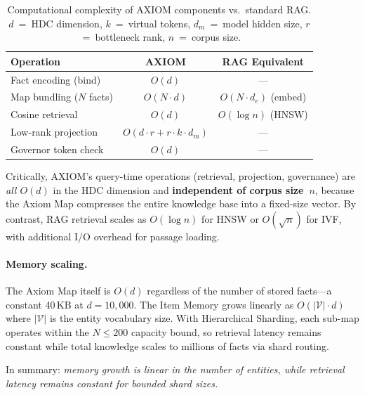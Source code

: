 \documentclass[11pt,a4paper]{article}
\begin{document}
\begin{table}[t]
    \centering
    \caption{Computational complexity of AXIOM components vs.\
    standard RAG.  $d$~=~HDC dimension, $k$~=~virtual tokens,
    $d_m$~=~model hidden size, $r$~=~bottleneck rank, $n$~=~corpus size.}
    \label{tab:complexity}
    \begin{tabular}{@{}lcc@{}}
        \toprule
        \textbf{Operation} & \textbf{AXIOM} & \textbf{RAG Equivalent} \\
        \midrule
        Fact encoding (bind)         & $O(d)$        & --- \\
        Map bundling ($N$ facts)     & $O(N \cdot d)$  & $O(N \cdot d_e)$ (embed) \\
        Cosine retrieval             & $O(d)$        & $O(\log n)$ (HNSW) \\
        Low-rank projection          & $O(d \cdot r + r \cdot k \cdot d_m)$
                                     & --- \\
        Governor token check         & $O(d)$        & --- \\
        \bottomrule
    \end{tabular}
\end{table}

Critically, AXIOM's query-time operations (retrieval, projection,
governance) are \emph{all $O(d)$} in the HDC dimension and
\textbf{independent of corpus size~$n$}, because the Axiom Map
compresses the entire knowledge base into a fixed-size vector.
By contrast, RAG retrieval scales as $O(\log n)$ for HNSW or
$O(\sqrt{n})$ for IVF, with additional I/O overhead for passage
loading.

\paragraph{Memory scaling.}
The Axiom Map itself is $O(d)$ regardless of the number of stored
facts---a constant 40\,KB at $d = 10{,}000$.  The Item Memory grows
linearly as $O(|\mathcal{V}| \cdot d)$ where $|\mathcal{V}|$ is the
entity vocabulary size.  With Hierarchical Sharding, each sub-map
operates within the $N \leq 200$ capacity bound, so retrieval latency
remains constant while total knowledge scales to millions of facts
via shard routing.

In summary: \emph{memory growth is linear in the number of entities,
while retrieval latency remains constant for bounded shard sizes.}

\end{document}
